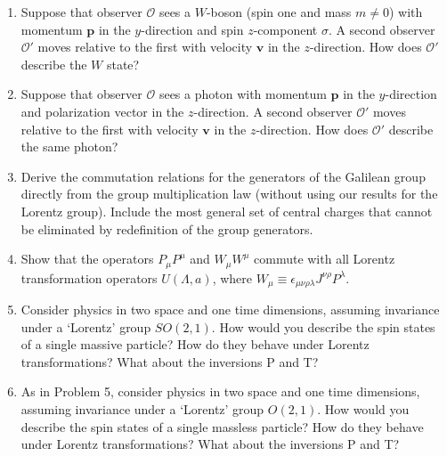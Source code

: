 \begin{enumerate}
\item Suppose that observer $\mathcal{O}$ sees a $W$-boson (spin one and mass
  $m\neq0$) with momentum $\mathbf{p}$ in the $y$-direction and spin
  $z$-component $\sigma$. A second observer $\mathcal{O}'$ moves relative to
  the first with velocity $\mathbf{v}$ in the $z$-direction. How does
  $\mathcal{O}'$ describe the $W$ state?

\item Suppose that observer $\mathcal{O}$ sees a photon with momentum
  $\mathbf{p}$ in the $y$-direction and polarization vector in the
  $z$-direction. A second observer $\mathcal{O}'$ moves relative to the first
  with velocity $\mathbf{v}$ in the $z$-direction. How does $\mathcal{O}'$
  describe the same photon?

\item Derive the commutation relations for the generators of the Galilean
  group directly from the group multiplication law (without using our
  results for the Lorentz group). Include the most general set of central
  charges that cannot be eliminated by redefinition of the group generators.

\item Show that the operators $P_\mu P^\mu$ and $W_\mu W^\mu$ commute with all
  Lorentz transformation operators $U(\Lambda,a)$, where
  $W_\mu\equiv\epsilon_{\mu\nu\rho\lambda}J^{\nu\rho}P^\lambda$.

\item Consider physics in two space and one time dimensions, assuming
  invariance under a `Lorentz' group $SO(2,1)$. How would you describe the
  spin states of a single massive particle? How do they behave under Lorentz
  transformations? What about the inversions P and T?

\item As in Problem 5, consider physics in two space and one time dimensions,
  assuming invariance under a `Lorentz' group $O(2,1)$. How would you describe
  the spin states of a single massless particle? How do they behave under
  Lorentz transformations? What about the inversions P and T?
\end{enumerate}


